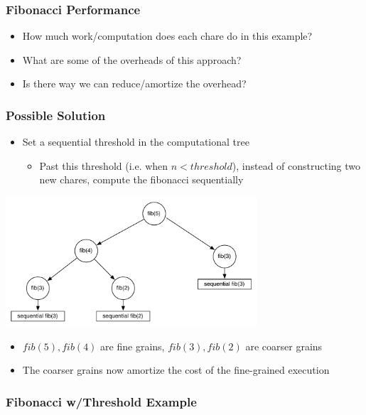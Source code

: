 \documentclass{beamer}
\begin{document}
\begin{frame}[fragile]
  \frametitle{Fibonacci Performance}
  \begin{itemize}
  \item How much work/computation does each chare do in this example?
  \item What are some of the overheads of this approach?
  \item Is there way we can reduce/amortize the overhead?
  \end{itemize}
\end{frame}

\begin{frame}[fragile]
  \frametitle{Possible Solution}
  \begin{itemize}
  \item Set a sequential threshold in the computational tree
    \begin{itemize}
    \item Past this threshold (i.e. when $n < threshold$), instead of
      constructing two new chares, compute the fibonacci sequentially
    \end{itemize}
  \end{itemize}
  \begin{center} \includegraphics[width=0.7\textwidth]{diagrams/tree-threshold.pdf} \end{center}
  \begin{itemize}
    \item $fib(5), fib(4)$ are fine grains, $fib(3), fib(2)$ are coarser grains
    \item The coarser grains now amortize the cost of the fine-grained execution
  \end{itemize}
\end{frame}

\begin{frame}[fragile]
  \frametitle{Fibonacci w/Threshold Example}
  
\end{frame}
\end{document}
